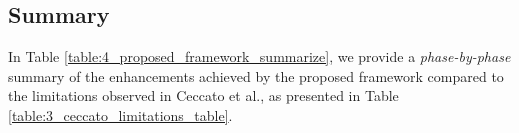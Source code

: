 
\subsection{Summary}
In Table \ref{table:4_proposed_framework_summarize}, we provide a \textit{phase-by-phase} summary of the enhancements achieved by the proposed framework compared to the limitations observed in Ceccato et al., as presented in Table \ref{table:3_ceccato_limitations_table}.

